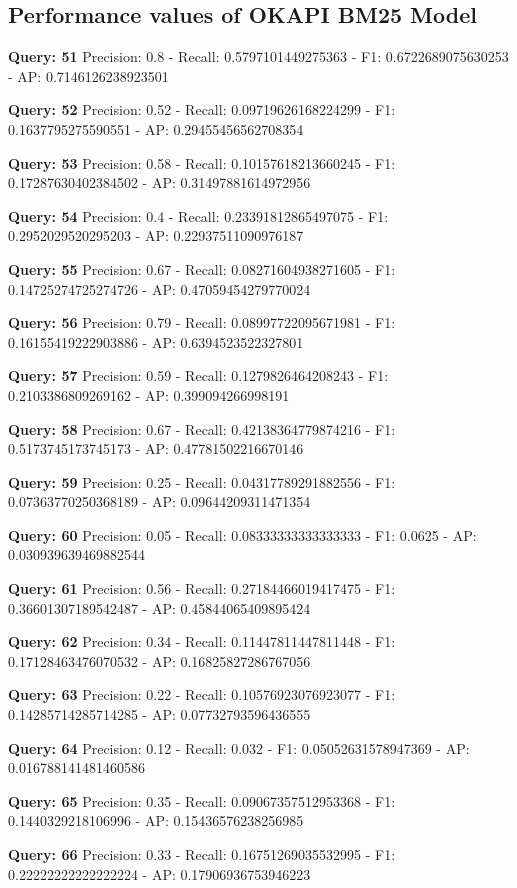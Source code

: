 \documentclass[a4paper, 11pt]{article}
\begin{document}
\subsection{Performance values of OKAPI BM25 Model}
\textbf{Query: 51}
Precision: 0.8 - Recall: 0.5797101449275363 - F1: 0.6722689075630253 - AP: 0.7146126238923501

\textbf{Query: 52}
Precision: 0.52 - Recall: 0.09719626168224299 - F1: 0.1637795275590551 - AP: 0.29455456562708354

\textbf{Query: 53}
Precision: 0.58 - Recall: 0.10157618213660245 - F1: 0.17287630402384502 - AP: 0.31497881614972956

\textbf{Query: 54}
Precision: 0.4 - Recall: 0.23391812865497075 - F1: 0.2952029520295203 - AP: 0.22937511090976187

\textbf{Query: 55}
Precision: 0.67 - Recall: 0.08271604938271605 - F1: 0.14725274725274726 - AP: 0.47059454279770024

\textbf{Query: 56}
Precision: 0.79 - Recall: 0.08997722095671981 - F1: 0.16155419222903886 - AP: 0.6394523522327801

\textbf{Query: 57}
Precision: 0.59 - Recall: 0.1279826464208243 - F1: 0.2103386809269162 - AP: 0.399094266998191

\textbf{Query: 58}
Precision: 0.67 - Recall: 0.42138364779874216 - F1: 0.5173745173745173 - AP: 0.47781502216670146

\textbf{Query: 59}
Precision: 0.25 - Recall: 0.04317789291882556 - F1: 0.07363770250368189 - AP: 0.09644209311471354

\textbf{Query: 60}
Precision: 0.05 - Recall: 0.08333333333333333 - F1: 0.0625 - AP:  0.030939639469882544

\textbf{Query: 61}
Precision: 0.56 - Recall: 0.27184466019417475 - F1: 0.36601307189542487 - AP: 0.45844065409895424

\textbf{Query: 62}
Precision: 0.34 - Recall: 0.11447811447811448 - F1: 0.17128463476070532 - AP:  0.16825827286767056

\textbf{Query: 63}
Precision: 0.22 - Recall: 0.10576923076923077 - F1: 0.14285714285714285 - AP:  0.07732793596436555

\textbf{Query: 64}
Precision: 0.12 - Recall: 0.032 - F1: 0.05052631578947369 - AP:  0.016788141481460586

\textbf{Query: 65}
Precision: 0.35 - Recall: 0.09067357512953368 - F1: 0.1440329218106996 - AP:  0.15436576238256985

\textbf{Query: 66}
Precision: 0.33 - Recall: 0.16751269035532995 - F1: 0.22222222222222224 - AP:  0.17906936753946223
\end{document}
